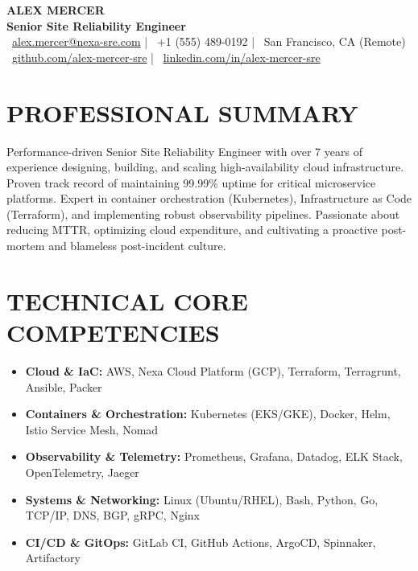 \documentclass[10pt,a4paper]{article}
\begin{document}
\color{darktext}

\begin{center}
  {\Huge \bfseries \color{accent} ALEX MERCER} \\[3pt]
  {\large \bfseries \color{lighttext} Senior Site Reliability Engineer} \\[5pt]
  \small
  \faEnvelope\ \href{mailto:alex.mercer@nexa-sre.com}{alex.mercer@nexa-sre.com} \quad | \quad
  \faPhone\ +1 (555) 489-0192 \quad | \quad
  \faGlobe\ San Francisco, CA (Remote) \\
  \faGithub\ \href{https://github.com/alex-mercer-sre}{github.com/alex-mercer-sre} \quad | \quad
  \faLinkedin\ \href{https://linkedin.com/in/alex-mercer-sre}{linkedin.com/in/alex-mercer-sre}
\end{center}
\vspace{1pt}

\section*{PROFESSIONAL SUMMARY}
Performance-driven Senior Site Reliability Engineer with over 7 years of experience designing, building, and scaling high-availability cloud infrastructure. Proven track record of maintaining 99.99\% uptime for critical microservice platforms. Expert in container orchestration (Kubernetes), Infrastructure as Code (Terraform), and implementing robust observability pipelines. Passionate about reducing MTTR, optimizing cloud expenditure, and cultivating a proactive post-mortem and blameless post-incident culture.

\section*{TECHNICAL CORE COMPETENCIES}
\begin{itemize}[leftmargin=*, label={}, noitemsep, topsep=0pt]
  \item \textbf{Cloud \& IaC:} AWS, Nexa Cloud Platform (GCP), Terraform, Terragrunt, Ansible, Packer
  \item \textbf{Containers \& Orchestration:} Kubernetes (EKS/GKE), Docker, Helm, Istio Service Mesh, Nomad
  \item \textbf{Observability \& Telemetry:} Prometheus, Grafana, Datadog, ELK Stack, OpenTelemetry, Jaeger
  \item \textbf{Systems \& Networking:} Linux (Ubuntu/RHEL), Bash, Python, Go, TCP/IP, DNS, BGP, gRPC, Nginx
  \item \textbf{CI/CD \& GitOps:} GitLab CI, GitHub Actions, ArgoCD, Spinnaker, Artifactory
\end{itemize}
\end{document}
